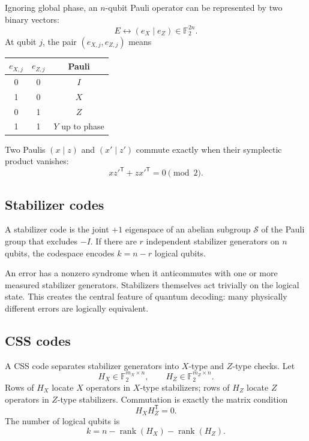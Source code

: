 \documentclass[11pt,letterpaper]{article}
\newcommand{\F}{\mathbb{F}_2}
\newcommand{\rank}{\operatorname{rank}}
\begin{document}
Ignoring global phase, an $n$-qubit Pauli operator can be represented by two binary vectors:
\begin{equation}
  E \longleftrightarrow (e_X\mid e_Z)\in\F^{2n}.
\end{equation}
At qubit $j$, the pair $(e_{X,j},e_{Z,j})$ means
\begin{center}
\begin{tabular}{c c c}
\toprule
$e_{X,j}$ & $e_{Z,j}$ & Pauli \\
\midrule
0 & 0 & $I$ \\
1 & 0 & $X$ \\
0 & 1 & $Z$ \\
1 & 1 & $Y$ up to phase \\
\bottomrule
\end{tabular}
\end{center}

Two Paulis $(x\mid z)$ and $(x'\mid z')$ commute exactly when their symplectic product vanishes:
\begin{equation}
  xz'^{\mathsf T}+zx'^{\mathsf T}=0\pmod 2.
\end{equation}

\subsection{Stabilizer codes}

A stabilizer code is the joint $+1$ eigenspace of an abelian subgroup $\mathcal S$ of the Pauli
group that excludes $-I$. If there are $r$ independent stabilizer generators on $n$ qubits, the
codespace encodes $k=n-r$ logical qubits.

An error has a nonzero syndrome when it anticommutes with one or more measured stabilizer
generators. Stabilizers themselves act trivially on the logical state. This creates the central
feature of quantum decoding: many physically different errors are logically equivalent.

\subsection{CSS codes}

A CSS code separates stabilizer generators into $X$-type and $Z$-type checks. Let
\begin{equation}
  H_X\in\F^{m_X\times n},\qquad H_Z\in\F^{m_Z\times n}.
\end{equation}
Rows of $H_X$ locate $X$ operators in $X$-type stabilizers; rows of $H_Z$ locate $Z$ operators in
$Z$-type stabilizers. Commutation is exactly the matrix condition
\begin{equation}
  H_XH_Z^{\mathsf T}=0.
  \label{eq:css-orthogonality}
\end{equation}
The number of logical qubits is
\begin{equation}
  k=n-\rank(H_X)-\rank(H_Z).
\end{equation}
\end{document}
